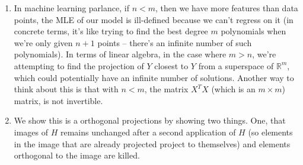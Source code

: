 \documentclass[submit]{harvardml}
\theoremstyle{plain}
\begin{document}
\begin{enumerate}[label=(\alph*)]
\item In machine learning parlance, if $n < m$, then we have more features than data points, the MLE of our model is ill-defined because we can't regress on it (in concrete terms, it's like trying to find the best degree $m$ polynomials when we're only given $n+1$ points -- there's an infinite number of such polynomials). In terms of linear algebra, in the case where $m > n$, we're attempting to find the projection of $Y$ closest to $Y$ from a superspace of $\mathbb{R}^m$, which could potentially have an infinite number of solutions. Another way to think about this is that with $n < m$, the matrix $X^TX$ (which is an $m \times m$) matrix, is not invertible.
\item We show this is a orthogonal projections by showing two things. One, that images of $H$ remains unchanged after a second application of $H$ (so elements in the image that are already projected project to themselves) and elements orthogonal to the image are killed.


\end{enumerate}
\end{document}
